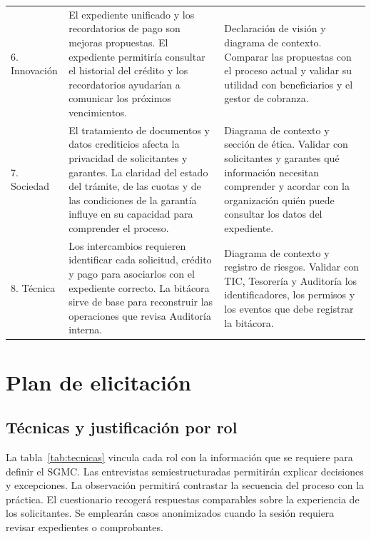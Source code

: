 \documentclass[11pt,a4paper]{article}
\begin{document}
\begin{longtable}{@{}L{.16}L{.40}L{.38}@{}}
6. Innovación
& El expediente unificado y los recordatorios de pago son mejoras
propuestas. El expediente permitiría consultar el historial del
crédito y los recordatorios ayudarían a comunicar los próximos
vencimientos.
& Declaración de visión y diagrama de contexto. Comparar las
propuestas con el proceso actual y validar su utilidad con
beneficiarios y el gestor de cobranza. \\
\addlinespace

7. Sociedad
& El tratamiento de documentos y datos crediticios afecta la
privacidad de solicitantes y garantes. La claridad del estado
del trámite, de las cuotas y de las condiciones de la garantía
influye en su capacidad para comprender el proceso.
& Diagrama de contexto y sección de ética. Validar con solicitantes
y garantes qué información necesitan comprender y acordar con la
organización quién puede consultar los datos del expediente. \\
\addlinespace

8. Técnica
& Los intercambios requieren identificar cada solicitud, crédito y
pago para asociarlos con el expediente correcto. La bitácora sirve
de base para reconstruir las operaciones que revisa Auditoría interna.
& Diagrama de contexto y registro de riesgos. Validar con TIC,
Tesorería y Auditoría los identificadores, los permisos y los eventos
que debe registrar la bitácora. \\

\end{longtable}
\endgroup

\section{Plan de elicitación}

\subsection{Técnicas y justificación por rol}

La tabla~\ref{tab:tecnicas} vincula cada rol con la información que
se requiere para definir el SGMC. Las entrevistas semiestructuradas
permitirán explicar decisiones y excepciones. La observación
permitirá contrastar la secuencia del proceso con la práctica.
El cuestionario recogerá respuestas comparables sobre la experiencia
de los solicitantes. Se emplearán casos anonimizados cuando la sesión
requiera revisar expedientes o comprobantes.
\end{document}
